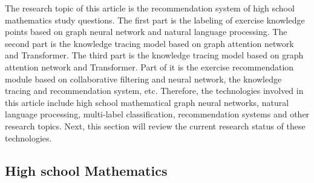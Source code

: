 The research topic of this article is the recommendation system of high school mathematics study questions. The first part is the labeling of exercise knowledge points based on graph neural network and natural language processing. The second part is the knowledge tracing model based on graph attention network and Transformer. The third part is the knowledge tracing model based on graph attention network and Transformer. Part of it is the exercise recommendation module based on collaborative filtering and neural network, the knowledge tracing and recommendation system, etc. Therefore, the technologies involved in this article include high school mathematical graph neural networks, natural language processing, multi-label classification, recommendation systems and other research topics. Next, this section will review the current research status of these technologies.

\subsection{High school Mathematics}

